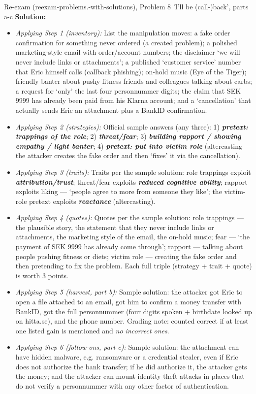 \documentclass[12pt, a4paper]{article}
\newcommand{\term}[1]{\textbf{\textit{#1}}}        %
\begin{document}
\begin{practicebox}{Re-exam (reexam-problems.-with-solutions), Problem 8 'I'll be (call-)back', parts a-c}
\textbf{Solution:}
\begin{itemize}
    \item \textit{Applying Step 1 (inventory):} List the manipulation moves: a fake order confirmation for something never ordered (a created problem); a polished marketing-style email with order/account numbers; the disclaimer `we will never include links or attachments';
    a published `customer service' number that Eric himself calls (callback phishing); on-hold music (Eye of the Tiger); friendly banter about pushy fitness friends and colleagues talking about carbs; a request for `only' the last four personnummer digits;
    the claim that SEK 9999 has already been paid from his Klarna account; and a `cancellation' that actually sends Eric an attachment plus a BankID confirmation.
    \item \textit{Applying Step 2 (strategies):} Official sample answers (any three): 1) \term{pretext: trappings of the role}; 2) \term{threat/fear}; 3) \term{building rapport / showing empathy / light banter}; 4) \term{pretext: put into victim role} (altercasting --- the attacker creates the fake order and then `fixes' it via the cancellation).
    \item \textit{Applying Step 3 (traits):} Traits per the sample solution: role trappings exploit \term{attribution/trust}; threat/fear exploits \term{reduced cognitive ability}; rapport exploits liking --- `people agree to more from someone they like'; the victim-role pretext exploits \term{reactance} (altercasting).
    \item \textit{Applying Step 4 (quotes):} Quotes per the sample solution: role trappings --- the plausible story, the statement that they never include links or attachments, the marketing style of the email, the on-hold music; fear --- `the payment of SEK 9999 has already come through';
    rapport --- talking about people pushing fitness or diets; victim role --- creating the fake order and then pretending to fix the problem. Each full triple (strategy + trait + quote) is worth 3 points.
    \item \textit{Applying Step 5 (harvest, part b):} Sample solution: the attacker got Eric to open a file attached to an email, got him to confirm a money transfer with BankID, got the full personnummer (four digits spoken + birthdate looked up on hitta.se), and the phone number. Grading note: counted correct if at least one listed gain is mentioned and \emph{no incorrect ones}.
    \item \textit{Applying Step 6 (follow-ons, part c):} Sample solution: the attachment can have hidden malware, e.g. ransomware or a credential stealer, even if Eric does not authorize the bank transfer; if he did authorize it, the attacker gets the money; and the attacker can mount identity-theft attacks in places that do not verify a personnummer with any other factor of authentication.
\end{itemize}


\end{practicebox}
\end{document}
